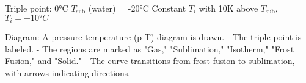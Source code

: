Triple point: 0°C  
\( T_{\text{sub}} \) (water) = -20°C  
Constant \( T_i \) with 10K above \( T_{\text{sub}} \), \( T_i = -10°C \)  

Diagram:  
A pressure-temperature (p-T) diagram is drawn.  
- The triple point is labeled.  
- The regions are marked as "Gas," "Sublimation," "Isotherm," "Frost Fusion," and "Solid."  
- The curve transitions from frost fusion to sublimation, with arrows indicating directions.